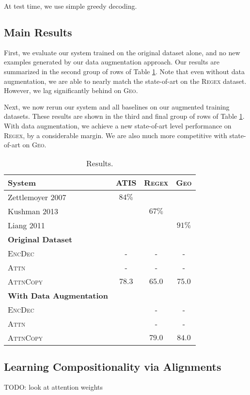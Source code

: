 \documentclass[11pt,letterpaper]{article}
\newcommand{\encdec}{\textsc{EncDec}\xspace}
\newcommand{\attn}{\textsc{Attn}\xspace}
\newcommand{\attncopy}{\textsc{AttnCopy}\xspace}
\newcommand{\atis}{\textsc{ATIS}\xspace}
\newcommand{\regex}{\textsc{Regex}\xspace}
\newcommand{\geo}{\textsc{Geo}\xspace}
\begin{document}
At test time, we use simple greedy decoding.

\subsection{Main Results}
First, we evaluate our system trained on the original dataset alone,
and no new examples generated by our data augmentation approach.
Our results are summarized in the second group of rows of Table \ref{tab:results}.
Note that even without data augmentation, we are able to nearly
match the state-of-art on the \regex dataset.
However, we lag significantly behind on \geo.

Next, we now rerun our system and all baselines on our
augmented training datasets.  These results are shown in the
third and final group of rows of Table \ref{tab:results}.
With data augmentation, we achieve a new state-of-art level performance
on \regex, by a considerable margin.  We are also much more competitive
with state-of-art on \geo.

\begin{table}
  \centering
  \small
  \begin{tabular}{|l|c|c|c|}
    \hline
    System & \atis & \regex & \geo \\
    \hline
    Zettlemoyer 2007 & $84\%$ & & \\
    Kushman 2013 & & $67\%$ & \\
    Liang 2011 & & & $91\%$ \\
    \hline
    \textbf{Original Dataset} & & & \\
    \encdec & - & - & - \\
    \attn & - & - & - \\
    \attncopy & $78.3$ & $65.0$ & $75.0$ \\
    \hline
    \textbf{With Data Augmentation} & & & \\
    \encdec & & - & - \\
    \attn & & - & - \\
    \attncopy & & $79.0$ & $84.0$ \\
    \hline
  \end{tabular}
  \caption{Results.}
  \label{tab:results}
\end{table}

\subsection{Learning Compositionality via Alignments}
TODO: look at attention weights
\end{document}
